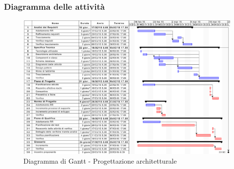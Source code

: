 		\subsubsection{Diagramma delle attività} %
		\label{ssub:diagramma_delle_attivita}
			\begin{figure}[htbp]
				\centering
				\centerline{\includegraphics[scale=0.7]{images/d_attivita_prog_architetturale.pdf}}
				\caption{Diagramma di Gantt - Progettazione architetturale}
				\label{fig:gantt_prog_architetturale}
			\end{figure}
	
